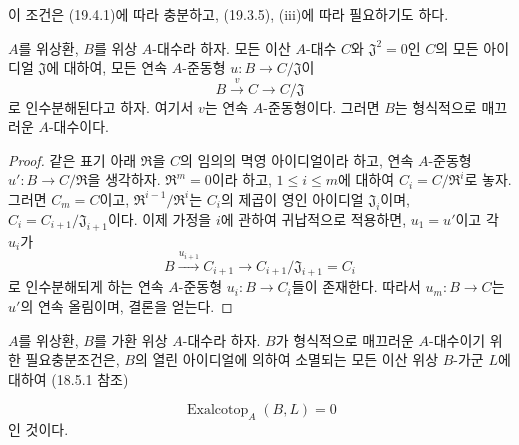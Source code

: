 이 조건은 (19.4.1)에 따라 충분하고, (19.3.5), (iii)에 따라
필요하기도 하다.

\begin{proposition}[19.4.3]
\label{0.19.4.3-fr}
$A$를 위상환, $B$를 위상 $A$-대수라 하자. 모든 이산 $A$-대수
$C$와 $\mathfrak J^2=0$인 $C$의 모든 아이디얼 $\mathfrak J$에
대하여, 모든 연속 $A$-준동형 $u:B\to C/\mathfrak J$이
\[
  B\xrightarrow{v}C\longrightarrow C/\mathfrak J
\]
로 인수분해된다고 하자. 여기서 $v$는 연속 $A$-준동형이다. 그러면
$B$는 형식적으로 매끄러운 $A$-대수이다.
\end{proposition}

\begin{proof}
같은 표기 아래 $\mathfrak R$을 $C$의 임의의 멱영 아이디얼이라
하고, 연속 $A$-준동형 $u':B\to C/\mathfrak R$을 생각하자.
$\mathfrak R^m=0$이라 하고, $1\leq i\leq m$에 대하여
$C_i=C/\mathfrak R^i$로 놓자. 그러면 $C_m=C$이고,
$\mathfrak R^{i-1}/\mathfrak R^i$는 $C_i$의 제곱이 영인 아이디얼
$\mathfrak J_i$이며,
$C_i=C_{i+1}/\mathfrak J_{i+1}$이다. 이제 가정을 $i$에 관하여
귀납적으로 적용하면, $u_1=u'$이고 각 $u_i$가
\[
  B\xrightarrow{u_{i+1}}C_{i+1}\longrightarrow
  C_{i+1}/\mathfrak J_{i+1}=C_i
\]
로 인수분해되게 하는 연속 $A$-준동형 $u_i:B\to C_i$들이
존재한다. 따라서 $u_m:B\to C$는 $u'$의 연속 올림이며, 결론을
얻는다.
\end{proof}

\begin{proposition}[19.4.4]
\label{0.19.4.4-fr}
$A$를 위상환, $B$를 가환 위상 $A$-대수라 하자. $B$가 형식적으로
매끄러운 $A$-대수이기 위한 필요충분조건은, $B$의 열린 아이디얼에
의하여 소멸되는 모든 이산 위상 $B$-가군 $L$에 대하여
(18.5.1 참조)


\[
  \operatorname{Exalcotop}_A(B,L)=0
\]
인 것이다.
\end{proposition}

